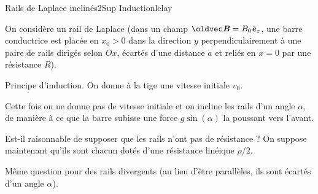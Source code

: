 \begin{exercise}{Rails de Laplace inclinés}{2}{Sup}
{Induction}{lelay}

On considère un rail de Laplace (dans un champ $\vec{B} = B_0\ve_z$, une barre conductrice est placée en $x_0 > 0$ dans la direction $y$ perpendiculairement à une paire de rails dirigés selon $Ox$, écartés d'une distance $a$ et reliés en $x = 0$ par une résistance $R$).

\begin{questions}
    \questioncours Principe d'induction.
    \question On donne à la tige une vitesse initiale $v_0$. 
    \question Cette fois on ne donne pas de vitesse initiale et on incline les rails d'un angle $\alpha$, de manière à ce que la barre subisse une force $g\sin(\alpha)$ la poussant vers l'avant.
    \question Est-il raisonnable de supposer que les rails n'ont pas de résistance ? On suppose maintenant qu'ils sont chacun dotés d'une résistance linéique $\rho/2$.
    \question Même question pour des rails divergents (au lieu d'être parallèles, ils sont écartés d'un angle $\alpha$).
\end{questions}

\end{exercise}